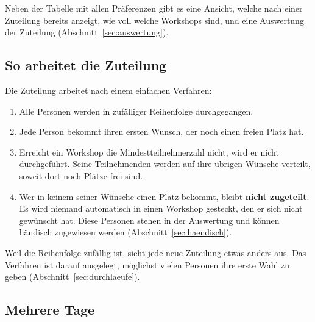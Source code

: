 \documentclass[a4paper,11pt]{article}
\begin{document}
Neben der Tabelle mit allen Präferenzen gibt es eine Ansicht, welche nach einer Zuteilung bereits anzeigt, wie voll welche
Workshops sind, und eine Auswertung der Zuteilung (Abschnitt~\ref{sec:auswertung}).

\subsection{So arbeitet die Zuteilung}\label{sec:algorithmus}

Die Zuteilung arbeitet nach einem einfachen Verfahren:
\begin{enumerate}
  \item Alle Personen werden in zufälliger Reihenfolge durchgegangen.
  \item Jede Person bekommt ihren ersten Wunsch, der noch einen freien Platz hat.
  \item Erreicht ein Workshop die Mindestteilnehmerzahl nicht, wird er nicht durchgeführt. Seine Teilnehmenden werden auf
  ihre übrigen Wünsche verteilt, soweit dort noch Plätze frei sind.
  \item Wer in keinem seiner Wünsche einen Platz bekommt, bleibt \textbf{nicht zugeteilt}. Es wird niemand automatisch in
  einen Workshop gesteckt, den er sich nicht gewünscht hat. Diese Personen stehen in der Auswertung und können
  händisch zugewiesen werden (Abschnitt~\ref{sec:haendisch}).
\end{enumerate}
Weil die Reihenfolge zufällig ist, sieht jede neue Zuteilung etwas anders aus. Das Verfahren ist darauf ausgelegt,
möglichst vielen Personen ihre erste Wahl zu geben (Abschnitt~\ref{sec:durchlaeufe}).

\subsection{Mehrere Tage}\label{sec:mehrtage}
\end{document}
